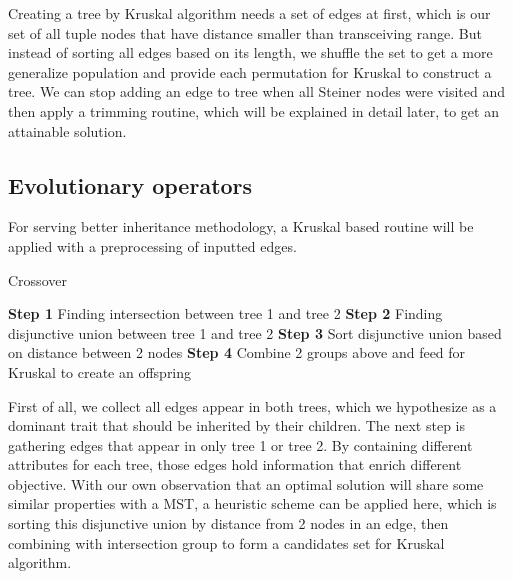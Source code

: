 	Creating a tree by Kruskal algorithm needs a set of edges at first, which is our set of all tuple nodes that have distance smaller than transceiving range. But instead of sorting all edges based on its length, we shuffle the set to get a more generalize population and provide each permutation for Kruskal to construct a tree. We can stop adding an edge to tree when all Steiner nodes were visited and then apply a trimming routine, which will be explained in detail later, to get an attainable solution.

\subsection{Evolutionary operators}
	For serving better inheritance methodology, a Kruskal based routine will be applied with a preprocessing of inputted edges.

\begin{algorithm}
\caption{Crossover}
\begin{algorithmic}[0]
\State \textbf{Step 1} Finding intersection between tree 1 and tree 2
\State \textbf{Step 2} Finding disjunctive union between tree 1 and tree 2
\State \textbf{Step 3} Sort disjunctive union based on distance between 2 nodes
\State \textbf{Step 4} Combine 2 groups above and feed for Kruskal to create an offspring
\end{algorithmic}
\end{algorithm}

	First of all, we collect all edges appear in both trees, which we hypothesize as a dominant trait that should be inherited by their children. The next step is gathering edges that appear in only tree 1 or tree 2. By containing different attributes for each tree, those edges hold information that enrich different objective. With our own observation that an optimal solution will share some similar properties with a MST, a heuristic scheme can be applied here, which is sorting this disjunctive union by distance from 2 nodes in an edge, then combining with intersection group to form a candidates set for Kruskal algorithm.

\noindent{}

